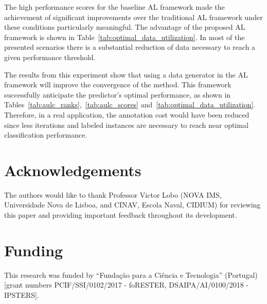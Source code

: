 \documentclass[remotesensing,article,submit,moreauthors,pdftex]{Definitions/mdpi}
\begin{document}
\begin{paracol}{2}
The high performance scores for the baseline AL framework made the achievement
of significant improvements over the traditional AL framework under these
conditions particularly meaningful. The advantage of the proposed AL framework
is shown in Table~\ref{tab:optimal_data_utilization}. In most of the presented
scenarios there is a substantial reduction of data necessary to reach a given
performance threshold. 

The results from this experiment show that using a data generator in the AL
framework will improve the convergence of the method. This framework
successfully anticipate the predictor's optimal performance, as shown in
Tables~\ref{tab:aulc_ranks},~\ref{tab:aulc_scores}
and~\ref{tab:optimal_data_utilization}. Therefore, in a real application, the
annotation cost would have been reduced since less iterations and labeled
instances are necessary to reach near optimal classification performance.

\section{Acknowledgements}

The authors would like to thank Professor Victor Lobo (NOVA IMS, Universidade
Nova de Lisboa, and CINAV, Escola Naval, CIDIUM) for reviewing this paper and
providing important feedback throughout its development.

\section{Funding}

This research was funded by ``Fundação para a Ciência e Tecnologia''
(Portugal) [grant numbers PCIF/SSI/0102/2017 - foRESTER, DSAIPA/AI/0100/2018 -
IPSTERS].

\end{paracol}


\end{document}
